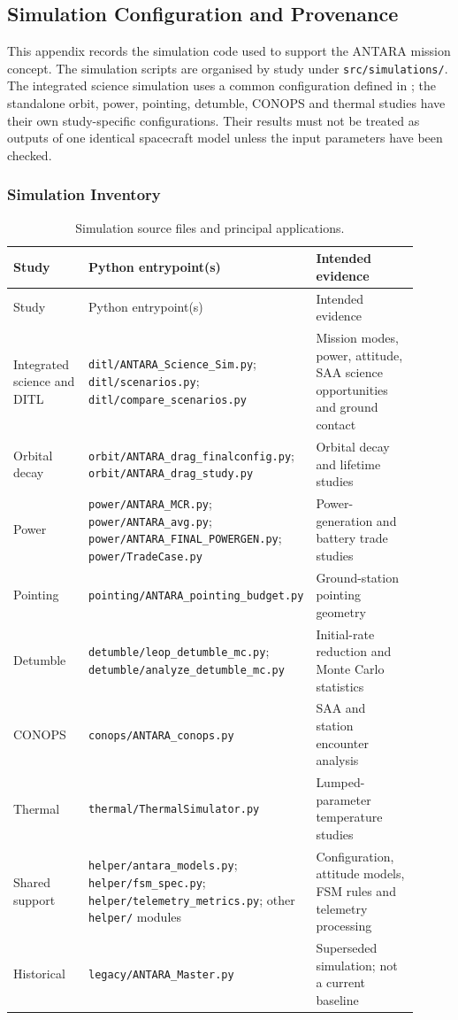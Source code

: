 \subsection{Simulation Configuration and Provenance}
\label{app:sim-provenance}

This appendix records the simulation code used to support the ANTARA mission concept. The simulation scripts are organised by study under \texttt{src/simulations/}. The integrated science simulation uses a common configuration defined in ; the standalone orbit, power, pointing, detumble, CONOPS and thermal studies have their own study-specific configurations. Their results must not be treated as outputs of one identical spacecraft model unless the input parameters have been checked.

\subsubsection{Simulation Inventory}
\label{app:sim-inventory}
\begin{longtable}{p{0.20\linewidth}p{0.43\linewidth}p{0.28\linewidth}}
\caption{Simulation source files and principal applications.}\label{tab:simulation-source-inventory}\\
\toprule
Study & Python entrypoint(s) & Intended evidence \\
\midrule
\endfirsthead
\toprule Study & Python entrypoint(s) & Intended evidence \\
\midrule
\endhead
Integrated science and DITL & \texttt{ditl/ANTARA\_Science\_Sim.py}; \texttt{ditl/scenarios.py}; \texttt{ditl/compare\_scenarios.py} & Mission modes, power, attitude, SAA science opportunities and ground contact \\
Orbital decay & \texttt{orbit/ANTARA\_drag\_finalconfig.py}; \texttt{orbit/ANTARA\_drag\_study.py} & Orbital decay and lifetime studies \\
Power & \texttt{power/ANTARA\_MCR.py}; \texttt{power/ANTARA\_avg.py}; \texttt{power/ANTARA\_FINAL\_POWERGEN.py}; \texttt{power/TradeCase.py} & Power-generation and battery trade studies \\
Pointing & \texttt{pointing/ANTARA\_pointing\_budget.py} & Ground-station pointing geometry \\
Detumble & \texttt{detumble/leop\_detumble\_mc.py}; \texttt{detumble/analyze\_detumble\_mc.py} & Initial-rate reduction and Monte Carlo statistics \\
CONOPS & \texttt{conops/ANTARA\_conops.py} & SAA and station encounter analysis \\
Thermal & \texttt{thermal/ThermalSimulator.py} & Lumped-parameter temperature studies \\
Shared support & \texttt{helper/antara\_models.py}; \texttt{helper/fsm\_spec.py}; \texttt{helper/telemetry\_metrics.py}; other \texttt{helper/} modules & Configuration, attitude models, FSM rules and telemetry processing \\
Historical & \texttt{legacy/ANTARA\_Master.py} & Superseded simulation; not a current baseline \\
\bottomrule
\end{longtable}


